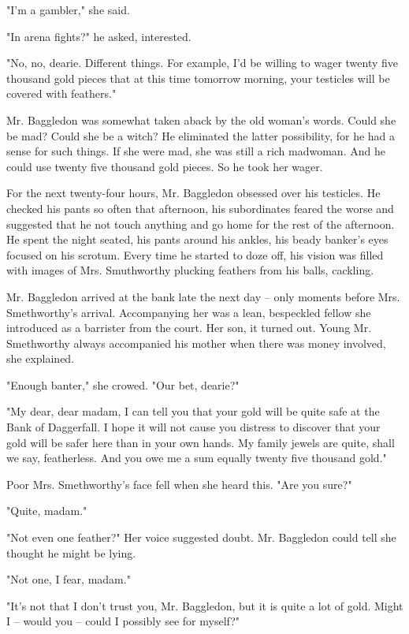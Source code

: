 "I'm a gambler," she said.

"In arena fights?" he asked, interested.

"No, no, dearie. Different things. For example, I'd be willing to wager twenty five thousand gold pieces that at this time tomorrow morning, your testicles will be covered with feathers."

Mr. Baggledon was somewhat taken aback by the old woman's words. Could she be mad? Could she be a witch? He eliminated the latter possibility, for he had a sense for such things. If she were mad, she was still a rich madwoman. And he could use twenty five thousand gold pieces. So he took her wager.

For the next twenty-four hours, Mr. Baggledon obsessed over his testicles. He checked his pants so often that afternoon, his subordinates feared the worse and suggested that he not touch anything and go home for the rest of the afternoon. He spent the night seated, his pants around his ankles, his beady banker's eyes focused on his scrotum. Every time he started to doze off, his vision was filled with images of Mrs. Smuthworthy plucking feathers from his balls, cackling.

Mr. Baggledon arrived at the bank late the next day -- only moments before Mrs. Smethworthy's arrival. Accompanying her was a lean, bespeckled fellow she introduced as a barrister from the court. Her son, it turned out. Young Mr. Smethworthy always accompanied his mother when there was money involved, she explained.

"Enough banter," she crowed. "Our bet, dearie?"

"My dear, dear madam, I can tell you that your gold will be quite safe at the Bank of Daggerfall. I hope it will not cause you distress to discover that your gold will be safer here than in your own hands. My family jewels are quite, shall we say, featherless. And you owe me a sum equally twenty five thousand gold."

Poor Mrs. Smethworthy's face fell when she heard this. "Are you sure?"

"Quite, madam."

"Not even one feather?" Her voice suggested doubt. Mr. Baggledon could tell she thought he might be lying.

"Not one, I fear, madam."

"It's not that I don't trust you, Mr. Baggledon, but it is quite a lot of gold. Might I -- would you -- could I possibly see for myself?"

